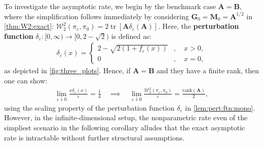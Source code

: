 \documentclass[noinfoline]{imsart}\setcounter{tocdepth}{2}
\newcommand{\m}[1]{\mathbf{#1}}
\renewcommand{\c}[1]{\mathcal{#1}}
\DeclareMathOperator{\tr}{tr}
\theoremstyle{plain}
\begin{document}
To investigate the asymptotic rate, we begin by the benchmark case $\m{A} = \m{B}$, where the simplification follows immediately by considering $\m{G}_0 = \m{M}_0 = \m{A}^{1/2}$ in \cref{thm:W2:exact}: $\c{W}_{2}^{2}(\pi_{\varepsilon}, \pi_{0}) = 2 \tr [\m{A} \delta_{\varepsilon}(\m{A})]$.
Here, the \textbf{perturbation function} $\delta_{\varepsilon} : [0, \infty) \to [0, 2-\sqrt{2})$ is defined as:
\begin{align}\label{eq:def:pert:ftn}
    \delta_{\varepsilon}(x) = \begin{cases}
        2 -  \sqrt{2(1+f_{\varepsilon}(x))} &, \quad x>0, \\
        0 &, \quad x=0,
    \end{cases}
\end{align}
as depicted in \cref{fig:three_plots}. Hence, if $\m{A}=\m{B}$ and they have a finite rank, then one can show:
\begin{align}\label{eq:univ:bdd:same}
    \lim_{\varepsilon \downarrow 0} \frac{x \delta_{\varepsilon}(x)}{\varepsilon} = \frac{1}{4} \quad \implies \quad \lim_{\varepsilon \downarrow 0} \frac{\c{W}_{2}^{2}(\pi_{\varepsilon}, \pi_{0})}{\varepsilon} = \frac{\mathrm{rank}(\m{A})}{2},
\end{align}
using the scaling property of the perturbation function $\delta_{\varepsilon}$ in \cref{lem:pert:ftn:mono}. However, in the infinite-dimensional setup, the nonparametric rate even of the simpliest scenario in the following corollary alludes that the exact asymptotic rate is intractable without further structural assumptions. 
\end{document}
